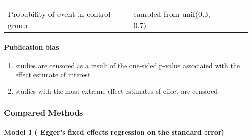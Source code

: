 \documentclass[english,doc,floatsintext]{apa6}
\providecommand{\tightlist}{%
  \setlength{\itemsep}{0pt}\setlength{\parskip}{0pt}}
\begin{document}
\begin{longtable}[]{@{}lllll@{}}
\begin{minipage}[t]{0.04\columnwidth}
\strut
\end{minipage} & \begin{minipage}[t]{0.01\columnwidth}\raggedright
\strut
\end{minipage}\tabularnewline
\begin{minipage}[t]{0.20\columnwidth}\raggedright
Probability of event in control group\strut
\end{minipage} & \begin{minipage}[t]{0.35\columnwidth}\raggedright
sampled from unif(0.3, 0.7)\strut
\end{minipage} & \begin{minipage}[t]{0.26\columnwidth}\raggedright
\strut
\end{minipage} & \begin{minipage}[t]{0.04\columnwidth}\raggedright
\strut
\end{minipage} & \begin{minipage}[t]{0.01\columnwidth}\raggedright
\strut
\end{minipage}\tabularnewline
\bottomrule
\end{longtable}

\hypertarget{publication-bias}{%
\paragraph{Publication bias}\label{publication-bias}}

\begin{enumerate}
\def\labelenumi{\arabic{enumi}.}
\tightlist
\item
  studies are censored as a result of the one-sided p-value associated with the effect estimate of interest
\item
  studies with the most extreme effect estimates of effect are censored
\end{enumerate}

\hypertarget{compared-methods}{%
\subsubsection{Compared Methods}\label{compared-methods}}

\hypertarget{model-1-eggers-fixed-effects-regression-on-the-standard-error}{%
\paragraph{Model 1 ( Egger's fixed effects regression on the standard error)}\label{model-1-eggers-fixed-effects-regression-on-the-standard-error}}
\end{document}
